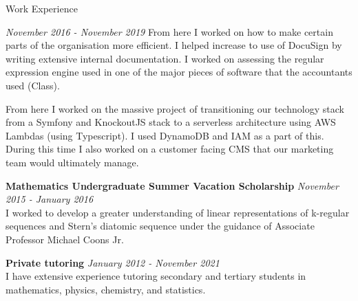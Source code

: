 \documentclass{resume} %
\begin{document}
\begin{rSection}{Work Experience}
\begin{adjustwidth}{2em}{}
\begin{rSubsection}{}{\em November 2016 - November 2019}{}{}
            From here I worked on how to make certain parts of the organisation more efficient. I helped increase
            to use of DocuSign by writing extensive internal documentation.
            I worked on assessing the regular expression engine used in one of the major pieces of software that
            the accountants used (Class).

            From here I worked on the massive project of transitioning our technology stack from a Symfony and KnockoutJS stack to a
            serverless architecture using AWS Lambdas (using Typescript). I used DynamoDB and IAM as a part of this. During this
            time I also worked on a customer facing CMS that our marketing team would ultimately manage.
        \end{rSubsection}
    \end{adjustwidth}

    {\bf Mathematics Undergraduate Summer Vacation Scholarship}
    \hfill {\em November 2015 - January 2016} \\
    I worked to develop a greater understanding of linear representations of k-regular
    sequences and Stern's diatomic sequence under the guidance of Associate Professor Michael Coons Jr.

        {\bf Private tutoring} \hfill {\em January 2012 - November 2021} \\
    I have extensive experience tutoring secondary and tertiary students in mathematics,
    physics, chemistry, and statistics.
\end{rSection}

\end{document}
